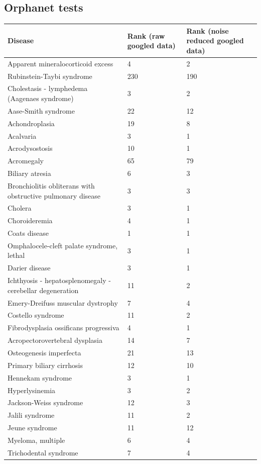 \documentclass[10pt,letterpaper,final]{article}
\begin{document}
\subsection{Orphanet tests}
\label{app:orphanet_raw_reduced}
\begin{center}
\begin{small}
	\begin{longtable}{|p{6cm}|p{2.5cm}|p{2.5cm}|}
	\hline
	\textbf{Disease}  & \textbf{Rank (raw googled data)} & \textbf{Rank (noise reduced googled data)} \\
    \hline\hline
    Apparent mineralocorticoid excess & 4 & 2\\    \hline
    Rubinstein-Taybi syndrome  & 230 & 190\\    \hline
    Cholestasis - lymphedema  (Aagenaes syndrome) & 3 & 2\\    \hline
    Aase-Smith syndrome  & 22 & 12\\    \hline
    Achondroplasia  & 19 & 8\\    \hline
    Acalvaria    & 3 & 1\\    \hline
    Acrodysostosis  & 10 & 1\\    \hline
    Acromegaly & 65 & 79\\    \hline
    Biliary atresia  & 6 & 3\\    \hline
    Bronchiolitis obliterans with obstructive pulmonary disease  & 3 & 3\\    \hline
    Cholera  & 3 & 1\\    \hline
    Choroideremia  & 4 & 1\\    \hline
    Coats disease  & 1 & 1\\    \hline
    Omphalocele-cleft palate syndrome, lethal  & 3 & 1\\    \hline
    Darier disease  & 3 & 1\\    \hline
    Ichthyosis - hepatosplenomegaly - cerebellar degeneration  & 11 & 2\\    \hline
    Emery-Dreifuss muscular dystrophy  & 7 & 4\\    \hline
    Costello syndrome  & 11 & 2\\    \hline
    Fibrodysplasia ossificans progressiva  & 4 & 1\\    \hline
    Acropectorovertebral dysplasia  & 14 & 7\\    \hline
    Osteogenesis imperfecta  & 21 & 13\\    \hline
    Primary biliary cirrhosis  & 12 & 10\\    \hline
    Hennekam syndrome  & 3 & 1\\    \hline
    Hyperlysinemia  & 3 & 2\\    \hline
    Jackson-Weiss syndrome  & 12 & 3\\    \hline
    Jalili syndrome & 11 & 2\\    \hline
    Jeune syndrome & 11 & 12\\    \hline
    Myeloma, multiple  & 6 & 4\\    \hline
    Trichodental syndrome  & 7 & 4\\    \hline
    \end{longtable}
\end{small}
\end{center}
\end{document}
